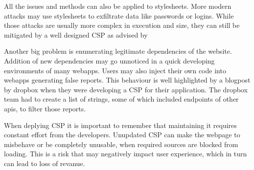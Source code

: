 \documentclass[11]{article}   %
\begin{document}
All the issues and methods can also be applied to stylesheets.
More modern attacks may use stylesheets to exfiltrate data like passwords or logins.
While those attacks are usually more complex in execution and size, they can still be mitigated by a well designed CSP as advised by \cite{??}

Another big problem is enumerating legitimate dependencies of the website.
Addition of new dependencies may go unnoticed in a quick developing environments of many webapps.
Users may also inject their own code into webapps generating false reports.
This behaviour is well highlighted by a blogpost by dropbox when they were developing a CSP for their application.
The dropbox team had to create a list of strings, some of which included endpoints of other apis, to filter those reports.

When deplying CSP it is important to remember that maintaining it requires constant effort from the developers.
Unupdated CSP can make the webpage to misbehave or be completely unusable, when required sources are blocked from loading.
This is a risk that may negatively impact user experience, which in turn can lead to loss of revanue.


\end{document}
